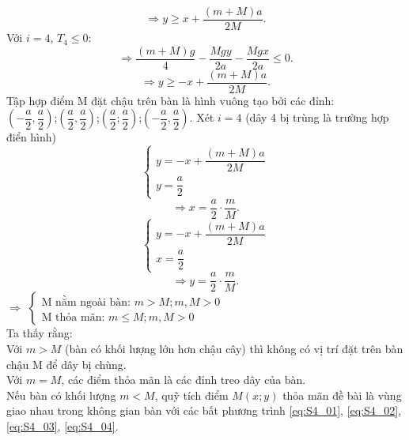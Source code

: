 \begin{enumerate}[label=(\alph*)]
\begin{enumerate}[label=(\roman*)]
\begin{equation}
\label{eq:S4_03}
\Longrightarrow
y \ge x + \dfrac{(m+M)a}{2M}.
\end{equation}
Với $i =4$, $T_4 \le 0$:
\begin{equation}
\Longrightarrow\dfrac{(m+M)g}{4}-\dfrac{Mgy}{2a}-\dfrac{Mgx}{2a} \le 0.
\end{equation}
\begin{equation}
\label{eq:S4_04}
\Longrightarrow
y \ge -x + \dfrac{(m+M)a}{2M}.
\end{equation}
Tập hợp điểm M đặt chậu trên bàn là hình vuông tạo bởi các đỉnh:
\\$\left(-\dfrac{a}{2},\dfrac{a}{2}\right)$;$\left(\dfrac{a}{2},\dfrac{a}{2}\right)$;$\left(\dfrac{a}{2};\dfrac{a}{2}\right)$;$\left(-\dfrac{a}{2},\dfrac{a}{2}\right)$.
Xét $i=4$ (dây 4 bị trùng là trường hợp điển hình)
\begin{equation}
   \begin{cases}
   y = -x + \dfrac{(m+M)a}{2M}
   \\
   y=\dfrac{a}{2}
   \end{cases}
\end{equation}
\begin{equation}
    \Longrightarrow x=\dfrac{a}{2}\cdot \dfrac{m}{M}.
\end{equation}
\begin{equation}
   \begin{cases}
   y = -x + \dfrac{(m+M)a}{2M}
   \\
   x=\dfrac{a}{2}
   \end{cases}
\end{equation}
\begin{equation}
    \Longrightarrow y=\dfrac{a}{2}\cdot \dfrac{m}{M}.
\end{equation}
$\Longrightarrow$ $\begin{cases}
\text{M nằm ngoài bàn: $m>M;m,M>0$}
\\
\text{M thỏa mãn: $m \le M ;m,M >0$}
\end{cases}$
\\
Ta thấy rằng:
\\Với $m>M$ (bàn có khối lượng lớn hơn chậu cây) thì không có vị trí đặt trên bàn chậu M để dây bị chùng.
\\ Với $m=M$, các điểm thỏa mãn là các đỉnh treo dây của bàn.
\\Nếu bàn có khối lượng $m<M$, quỹ tích điểm $M(x;y)$ thỏa mãn đề bài là vùng giao nhau trong không gian bàn với các bất phương trình \eqref{eq:S4_01}, \eqref{eq:S4_02}, \eqref{eq:S4_03}, \eqref{eq:S4_04}.


\end{enumerate}
\end{enumerate}
